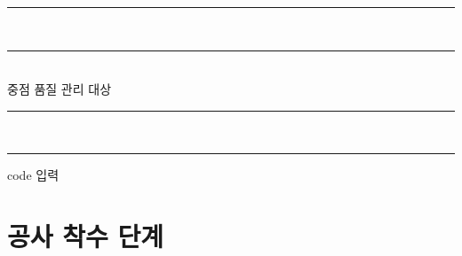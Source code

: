 \documentclass[12pt,a4paper]{book}
\begin{document}
				\newpage   
				\thispagestyle{empty}
				\begin{center}
				\null
				\vspace{6em} %
		
				\rule{\textwidth}{1.6pt}\\[-1.9em]%
				\rule{\textwidth}{0.4pt}\\[2em]
		
				{\Huge 중점 품질 관리 대상 }\\[1.0em]
		
				\rule{\textwidth}{0.4pt}\\[-1.7em]
				\rule{\textwidth}{1.6pt}
				\end{center}



\newpage

			\newenvironment{typing_code}
			{ 	\setlength{\fboxsep}{12pt}
				\begin{boxedminipage}[c]{1.0\linewidth}
				\color{blue}
			}
			{ 	\end{boxedminipage} 
				\color{black}
			}


			\begin{typing_code}
			code 입력
			\end{typing_code}
			








\newpage
\chapter{공사 착수 단계}

























\end{document}

